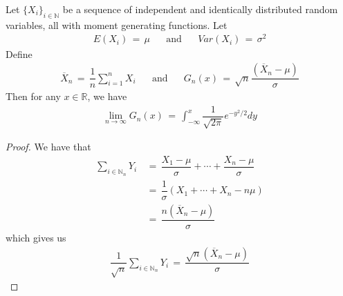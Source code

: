 \begin{theorem}
    Let $\{X_{i}\}_{i \in \mathbb{N}}$ be a sequence of independent and identically distributed random variables, all with moment generating functions. Let
    \begin{align*}
        E(X_{i}) \hspace{2pt} = \hspace{2pt} \mu \hspace{20pt} \text{and} \hspace{20pt} Var(X_{i}) \hspace{2pt} = \hspace{2pt} \sigma^{2}
    \end{align*}
    Define 
    \begin{align*}
        \overline{X}_{n} \hspace{2pt} = \hspace{2pt} \dfrac{1}{n} \sum_{i = 1}^{n} X_{i} \hspace{20pt} \text{and} \hspace{20pt} G_{n}(x) \hspace{2pt} = \hspace{2pt} \sqrt{n}\dfrac{(\overline{X}_{n} - \mu)}{\sigma}
    \end{align*}
    Then for any $x \in \mathbb{R}$, we have
    \begin{align*}
        \lim_{n \longrightarrow \infty} G_{n}(x) \hspace{2pt} = \hspace{2pt} \int_{-\infty}^{x} \dfrac{1}{\sqrt{2 \pi}} e^{-y^{2}/2} dy
    \end{align*}
    \begin{proof}
        We have that
        \begin{align*}
            \sum_{i \in \mathbb{N}_{n}} Y_{i} \hspace{2pt} &= \hspace{2pt} \dfrac{X_{1} - \mu}{\sigma} + \cdots + \dfrac{X_{n} - \mu}{\sigma} \\[1ex]
            &= \hspace{2pt} \dfrac{1}{\sigma} (X_{1} + \cdots + X_{n} - n\mu) \\[1ex]
            &= \hspace{2pt} \dfrac{n(\overline{X}_{n} - \mu)}{\sigma}
        \end{align*}
        which gives us
        \begin{align*}
            \dfrac{1}{\sqrt{n}} \sum_{i \in \mathbb{N}_{n}} Y_{i} \hspace{2pt} = \hspace{2pt} \dfrac{\sqrt{n}(\overline{X}_{n} - \mu)}{\sigma}
        \end{align*}
    \end{proof}
\end{theorem}